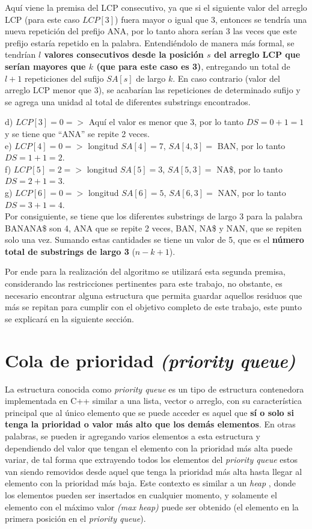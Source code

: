 Aquí viene la premisa del LCP consecutivo, ya que si el siguiente valor del arreglo LCP (para este caso $LCP[3]$) fuera mayor o igual que 3, entonces se tendría una nueva repetición del prefijo ANA, por lo tanto ahora serían 3 las veces que este prefijo estaría repetido en la palabra. Entendiéndolo de manera más formal, se tendrían \textbf{$l$ valores consecutivos desde la posición $s$ del arreglo LCP que serían mayores que $k$ (que para este caso es 3)}, entregando un total de $l+1$ repeticiones del sufijo $SA[s]$ de largo $k$. En caso contrario (valor del arreglo LCP menor que 3), se acabarían las repeticiones de determinado sufijo y se agrega una unidad al total de diferentes substrings encontrados.

d) $LCP[3]=0 =>$ Aquí el valor es menor que 3, por lo tanto $DS=0+1=1$ y se tiene que ``ANA'' se repite 2 veces.\\
e) $LCP[4]=0 =>$ longitud $SA[4] = 7$, $SA[4,3] =$ BAN, por lo tanto $DS=1+1=2$.\\
f) $LCP[5]=2 =>$ longitud $SA[5] = 3$, $SA[5,3] =$ NA\$, por lo tanto $DS=2+1=3$.\\
g) $LCP[6]=0 =>$ longitud $SA[6] = 5$, $SA[6,3] =$ NAN, por lo tanto $DS=3+1=4$.\\

Por consiguiente, se tiene que los diferentes substrings de largo 3 para la palabra BANANA\$ son 4, ANA que se repite 2 veces, BAN, NA\$ y NAN, que se repiten solo una vez. Sumando estas cantidades se tiene un valor de 5, que es el \textbf{número total de substrings de largo 3} ($n-k+1$).

Por ende para la realización del algoritmo se utilizará esta segunda premisa, considerando las restricciones pertinentes para este trabajo, no obstante, es necesario encontrar alguna estructura que permita guardar aquellos residuos que más se repitan para cumplir con el objetivo completo de este trabajo, este punto se explicará en la siguiente sección.

\section{Cola de prioridad \textit{(priority queue)}}

La estructura conocida como \textit{priority queue} \cite{queues} es un tipo de estructura contenedora implementada en C++ \cite{tutorial} similar a una lista, vector o arreglo, con su característica principal que al único elemento que se puede acceder es aquel que \textbf{sí o solo si tenga la prioridad o valor más alto que los demás elementos}. En otras palabras, se pueden ir agregando varios elementos a esta estructura y dependiendo del valor que tengan el elemento con la prioridad más alta puede variar, de tal forma que extrayendo todos los elementos del \textit{priority queue} estos van siendo removidos desde aquel que tenga la prioridad más alta hasta llegar al elemento con la prioridad más baja. Este contexto es similar a un \textit{heap} \cite{tutorial}, donde los elementos pueden ser insertados en cualquier momento, y solamente el elemento con el máximo valor \textit{(max heap)} puede ser obtenido (el elemento en la primera posición en el \textit{priority queue}).

